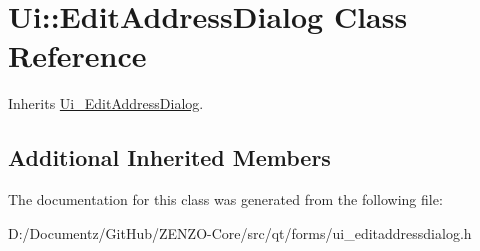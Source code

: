 \hypertarget{class_ui_1_1_edit_address_dialog}{}\section{Ui\+::Edit\+Address\+Dialog Class Reference}
\label{class_ui_1_1_edit_address_dialog}


Inherits \mbox{\hyperlink{class_ui___edit_address_dialog}{Ui\+\_\+\+Edit\+Address\+Dialog}}.

\subsection*{Additional Inherited Members}


The documentation for this class was generated from the following file\+:\begin{DoxyCompactItemize}
\item 
D\+:/\+Documentz/\+Git\+Hub/\+Z\+E\+N\+Z\+O-\/\+Core/src/qt/forms/ui\+\_\+editaddressdialog.\+h\end{DoxyCompactItemize}
